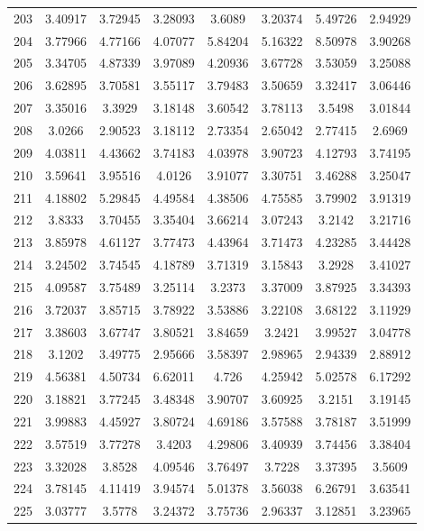 \begin{center}
\begin{longtable}{cccccccc}
203 & 3.40917 & 3.72945 & 3.28093 & 3.6089 & 3.20374 & 5.49726 & 2.94929\\
204 & 3.77966 & 4.77166 & 4.07077 & 5.84204 & 5.16322 & 8.50978 & 3.90268\\
205 & 3.34705 & 4.87339 & 3.97089 & 4.20936 & 3.67728 & 3.53059 & 3.25088\\
206 & 3.62895 & 3.70581 & 3.55117 & 3.79483 & 3.50659 & 3.32417 & 3.06446\\
207 & 3.35016 & 3.3929 & 3.18148 & 3.60542 & 3.78113 & 3.5498 & 3.01844\\
208 & 3.0266 & 2.90523 & 3.18112 & 2.73354 & 2.65042 & 2.77415 & 2.6969\\
209 & 4.03811 & 4.43662 & 3.74183 & 4.03978 & 3.90723 & 4.12793 & 3.74195\\
210 & 3.59641 & 3.95516 & 4.0126 & 3.91077 & 3.30751 & 3.46288 & 3.25047\\
211 & 4.18802 & 5.29845 & 4.49584 & 4.38506 & 4.75585 & 3.79902 & 3.91319\\
212 & 3.8333 & 3.70455 & 3.35404 & 3.66214 & 3.07243 & 3.2142 & 3.21716\\
213 & 3.85978 & 4.61127 & 3.77473 & 4.43964 & 3.71473 & 4.23285 & 3.44428\\
214 & 3.24502 & 3.74545 & 4.18789 & 3.71319 & 3.15843 & 3.2928 & 3.41027\\
215 & 4.09587 & 3.75489 & 3.25114 & 3.2373 & 3.37009 & 3.87925 & 3.34393\\
216 & 3.72037 & 3.85715 & 3.78922 & 3.53886 & 3.22108 & 3.68122 & 3.11929\\
217 & 3.38603 & 3.67747 & 3.80521 & 3.84659 & 3.2421 & 3.99527 & 3.04778\\
218 & 3.1202 & 3.49775 & 2.95666 & 3.58397 & 2.98965 & 2.94339 & 2.88912\\
219 & 4.56381 & 4.50734 & 6.62011 & 4.726 & 4.25942 & 5.02578 & 6.17292\\
220 & 3.18821 & 3.77245 & 3.48348 & 3.90707 & 3.60925 & 3.2151 & 3.19145\\
221 & 3.99883 & 4.45927 & 3.80724 & 4.69186 & 3.57588 & 3.78187 & 3.51999\\
222 & 3.57519 & 3.77278 & 3.4203 & 4.29806 & 3.40939 & 3.74456 & 3.38404\\
223 & 3.32028 & 3.8528 & 4.09546 & 3.76497 & 3.7228 & 3.37395 & 3.5609\\
224 & 3.78145 & 4.11419 & 3.94574 & 5.01378 & 3.56038 & 6.26791 & 3.63541\\
225 & 3.03777 & 3.5778 & 3.24372 & 3.75736 & 2.96337 & 3.12851 & 3.23965\\

\end{longtable}
\end{center}
